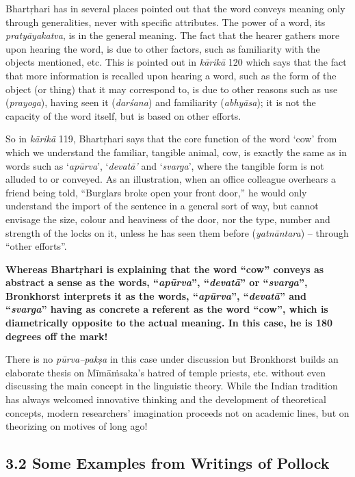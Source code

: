 Bhartṛhari has in several places pointed out that the word conveys meaning only through generalities, never with specific attributes. The power of a word, its \textit{pratyāyakatva}, is in the general meaning. The fact that the hearer gathers more upon hearing the word, is due to other factors, such as familiarity with the objects mentioned, etc. This is pointed out in \textit{kārikā} 120 which says that the fact that more information is recalled upon hearing a word, such as the form of the object (or thing) that it may correspond to, is due to other reasons such as use (\textit{prayoga}), having seen it (\textit{darśana}) and familiarity (\textit{abhyāsa}); it is not the capacity of the word itself, but is based on other efforts.

So in \textit{kārikā} 119, Bhartṛhari says that the core function of the word ‘cow’ from which we understand the familiar, tangible animal, cow, is exactly the same as in words such as ‘\textit{apūrva}’, ‘\textit{devatā’} and ‘\textit{svarga}’, where the tangible form is not alluded to or conveyed. As an illustration, when an office colleague overhears a friend being told, “Burglars broke open your front door,” he would only understand the import of the sentence in a general sort of way, but cannot envisage the size, colour and heaviness of the door, nor the type, number and strength of the locks on it, unless he has seen them before (\textit{yatnāntara}) – through “other efforts”.

\textbf{Whereas Bhartṛhari is explaining that the word “cow” conveys as abstract a sense as the words, “\textit{apūrva}”, “\textit{devatā}” or “\textit{svarga}”, Bronkhorst interprets it as the words, “\textit{apūrva}”, “\textit{devatā}” and “\textit{svarga}” having as concrete a referent as the word “cow”, which is diametrically opposite to the actual meaning. In this case, he is 180 degrees off the mark!}

There is no \textit{pūrva--pakṣa} in this case under discussion but Bronkhorst builds an elaborate thesis on Mīmāṁsaka’s hatred of temple priests, etc. without even discussing the main concept in the linguistic theory. While the Indian tradition has always welcomed innovative thinking and the development of theoretical concepts, modern researchers’ imagination proceeds not on academic lines, but on theorizing on motives of long ago!

\vspace{-.3cm}

\subsection*{3.2 Some Examples from Writings of Pollock}

